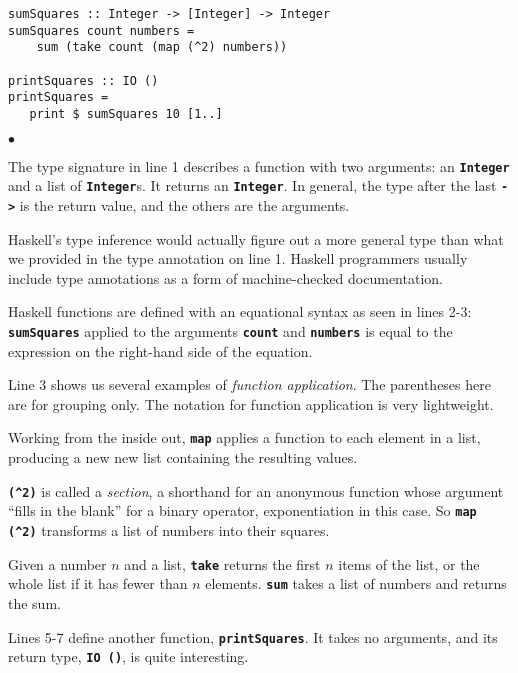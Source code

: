 \documentclass[12pt]{article}
\newcommand\codebold[1]{\texttt{\textbf{#1}}}
\newenvironment{notelist}{\begin{list}
   {$\bullet$}
   {\setlength{\itemsep}{0in}}}
   {\end{list}}
\begin{document}
\begin{lstlisting}
sumSquares :: Integer -> [Integer] -> Integer
sumSquares count numbers =
    sum (take count (map (^2) numbers))

printSquares :: IO ()
printSquares =
   print $ sumSquares 10 [1..]
\end{lstlisting}

\begin{notelist}
    \item The type signature in line 1 describes a function with two arguments: an \codebold{Integer} and a list
          of \codebold{Integer}s. It returns an \codebold{Integer}. In general, the type after the last \codebold{->}
          is the return value, and the others are the arguments.
    \item Haskell's type inference would actually figure out a more general type than what we provided in the type
          annotation on line 1. Haskell programmers usually include type annotations as a form of machine-checked
          documentation.
    \item Haskell functions are defined with an equational syntax as seen in lines 2-3: \codebold{sumSquares}
          applied to the arguments \codebold{count} and \codebold{numbers} is equal to the expression on the
          right-hand side of the equation.
    \item Line 3 shows us several examples of \textit{function application}. The parentheses here are for grouping
          only. The notation for function application is very lightweight.
    \item Working from the inside out, \codebold{map} applies a function to each element in a list, producing a new 
          new list containing the resulting values.
    \item \codebold{(\string^2)} is called a \textit{section}, a shorthand for an anonymous function whose argument
          ``fills in the blank'' for a binary operator, exponentiation in this case. So \codebold{map (\string^2)}
          transforms a list of numbers into their squares.
    \item Given a number $n$ and a list, \codebold{take} returns the first $n$ items of the list, or the whole list
          if it has fewer than $n$ elements. \codebold{sum} takes a list of numbers and returns the sum.
    \item Lines 5-7 define another function, \codebold{printSquares}. It takes no arguments, and its return type, \codebold{IO ()},
          is quite interesting.

\end{notelist}
\end{document}
